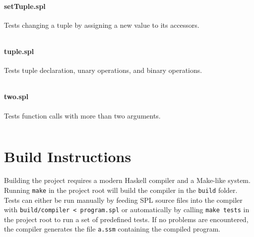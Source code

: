 \documentclass[a4paper]{article}
\begin{document}
\paragraph{setTuple.spl}
Tests changing a tuple by assigning a new value to its accessors.
\begin{verbatim}\end{verbatim}

\paragraph{tuple.spl}
Tests tuple declaration, unary operations, and binary operations.
\begin{verbatim}\end{verbatim}

\paragraph{two.spl}
Tests function calls with more than two arguments.
\begin{verbatim}\end{verbatim}


\section{Build Instructions}

Building the project requires a modern Haskell compiler and a Make-like system.
Running \verb|make| in the project root will build the compiler in the \verb|build| folder.
Tests can either be run manually by feeding SPL source files into the compiler with \verb|build/compiler < program.spl| or automatically by calling \verb|make tests| in the project root to run a set of predefined tests.
If no problems are encountered, the compiler generates the file \verb|a.ssm| containing the compiled program.
\end{document}
